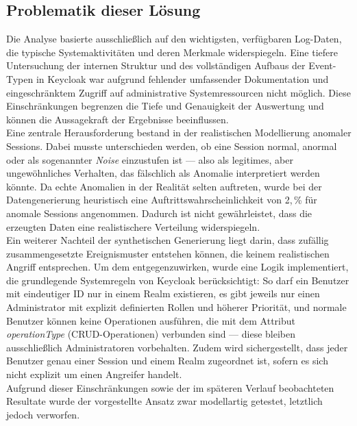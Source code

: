 \documentclass[a4paper,12pt]{article}
\begin{document}
	\subsection{Problematik dieser Lösung}
	Die Analyse basierte ausschließlich auf den wichtigsten, verfügbaren Log-Daten, die typische Systemaktivitäten und deren Merkmale widerspiegeln. Eine tiefere Untersuchung der internen Struktur und des vollständigen Aufbaus der Event-Typen in Keycloak war aufgrund fehlender umfassender Dokumentation und eingeschränktem Zugriff auf administrative Systemressourcen nicht möglich. Diese Einschränkungen begrenzen die Tiefe und Genauigkeit der Auswertung und können die Aussagekraft der Ergebnisse beeinflussen.
	\\[0.5em]
	Eine zentrale Herausforderung bestand in der realistischen Modellierung anomaler Sessions. Dabei musste unterschieden werden, ob eine Session normal, anormal oder als sogenannter \textit{Noise} einzustufen ist — also als legitimes, aber ungewöhnliches Verhalten, das fälschlich als Anomalie interpretiert werden könnte. Da echte Anomalien in der Realität selten auftreten, wurde bei der Datengenerierung heuristisch eine Auftrittswahrscheinlichkeit von 2,\,\% für anomale Sessions angenommen. Dadurch ist nicht gewährleistet, dass die erzeugten Daten eine realistischere Verteilung widerspiegeln.
	\\[0.5em]
	Ein weiterer Nachteil der synthetischen Generierung liegt darin, dass zufällig zusammengesetzte Ereignismuster entstehen können, die keinem realistischen Angriff entsprechen. Um dem entgegenzuwirken, wurde eine Logik implementiert, die grundlegende Systemregeln von Keycloak berücksichtigt: So darf ein Benutzer mit eindeutiger ID nur in einem Realm existieren, es gibt jeweils nur einen Administrator mit explizit definierten Rollen und höherer Priorität, und normale Benutzer können keine Operationen ausführen, die mit dem Attribut \textit{operationType} (CRUD-Operationen) verbunden sind — diese bleiben ausschließlich Administratoren vorbehalten. Zudem wird sichergestellt, dass jeder Benutzer genau einer Session und einem Realm zugeordnet ist, sofern es sich nicht explizit um einen Angreifer handelt.
	\\[0.5em]
	Aufgrund dieser Einschränkungen sowie der im späteren Verlauf beobachteten Resultate wurde der vorgestellte Ansatz zwar modellartig getestet, letztlich jedoch verworfen.
	
\end{document}
